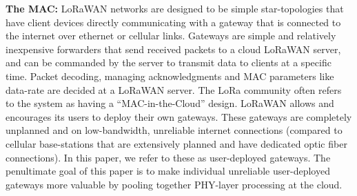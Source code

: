 
\noindent \textbf{The MAC: } LoRaWAN networks are designed to be simple
star-topologies that have client devices directly communicating with a gateway
that is connected to the internet over ethernet or cellular links. Gateways
are simple and relatively inexpensive forwarders that send received packets to
a cloud LoRaWAN server, and can be commanded by the server to transmit data to
clients at a specific time. Packet decoding, managing acknowledgments and MAC
parameters like data-rate are decided at a LoRaWAN server. The LoRa community
often refers to the system as having a ``MAC-in-the-Cloud'' design. LoRaWAN
allows and encourages its users to deploy their own gateways. These gateways
are completely unplanned and on low-bandwidth, unreliable internet connections
(compared to cellular base-stations that are extensively planned and have
dedicated optic fiber connections). In this paper, we refer to these as
user-deployed gateways. The penultimate goal of this paper is to make
individual unreliable user-deployed gateways more valuable by pooling together
PHY-layer processing at the cloud.
